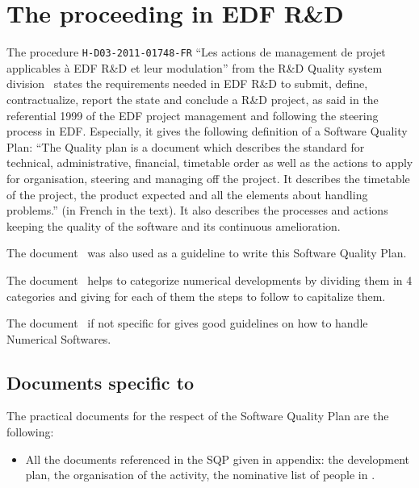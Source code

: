 \chapter{The proceeding in EDF R\&D}

The procedure \verb!H-D03-2011-01748-FR! ``Les actions de management de projet
applicables à EDF R\&D et leur modulation'' from the R\&D Quality system
division~\cite{projmanag} states the requirements needed in EDF
R\&D to submit, define, contractualize, report the state and conclude a R\&D
project, as said in the referential 1999 of the EDF project management and
following the steering process in EDF\@. Especially, it gives the following
definition of a Software Quality Plan: ``The Quality plan is a document which
describes the standard for technical, administrative, financial, timetable
order as well as the actions to apply for organisation, steering and managing
off the project. It describes the timetable of the project, the product
expected and all the elements about handling problems.'' (in French in the
text). It also describes the processes and actions keeping the quality of the
software and its continuous amelioration.

The document~\cite{guidepql} was also used as a guideline to write this Software
Quality Plan.

The document~\cite{capelemnum} helps to categorize numerical developments by
dividing them in 4 categories and giving for each of them the steps to follow
to capitalize them.

The document~\cite{Ocs} if not specific for \telemacsystem{} gives good
guidelines on how to handle Numerical Softwares.

\section{Documents specific to \telemacsystem}

The practical documents for the respect of the Software Quality Plan are the
following:
\begin{itemize}
\item All the documents referenced in the SQP given in appendix: the
  development plan, the organisation of the \telemacsystem{} activity, the
  nominative list of people in \telemacsystem.
\end{itemize}
